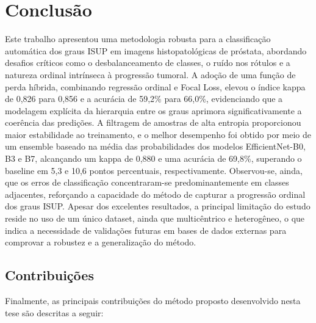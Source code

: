 \chapter{Conclusão}
\label{cap:conclusao}
Este trabalho apresentou uma metodologia robusta para a classificação automática dos graus ISUP em imagens histopatológicas de próstata, abordando desafios críticos como o desbalanceamento de classes, o ruído nos rótulos e a natureza ordinal intrínseca à progressão tumoral. A adoção de uma função de perda híbrida, combinando regressão ordinal e Focal Loss, elevou o índice kappa de 0,826 para 0,856 e a acurácia de 59,2\% para 66,0\%, evidenciando que a modelagem explícita da hierarquia entre os graus aprimora significativamente a coerência das predições. A filtragem de amostras de alta entropia proporcionou maior estabilidade ao treinamento, e o melhor desempenho foi obtido por meio de um ensemble baseado na média das probabilidades dos modelos EfficientNet-B0, B3 e B7, alcançando um kappa de 0,880 e uma acurácia de 69,8\%, superando o baseline em 5,3 e 10,6 pontos percentuais, respectivamente. Observou-se, ainda, que os erros de classificação concentraram-se predominantemente em classes adjacentes, reforçando a capacidade do método de capturar a progressão ordinal dos graus ISUP. Apesar dos excelentes resultados, a principal limitação do estudo reside no uso de um único dataset, ainda que multicêntrico e heterogêneo, o que indica a necessidade de validações futuras em bases de dados externas para comprovar a robustez e a generalização do método.

\section{Contribuições}
\label{sec:contribuições}
Finalmente, as principais contribuições do método proposto desenvolvido nesta tese são descritas a seguir:

